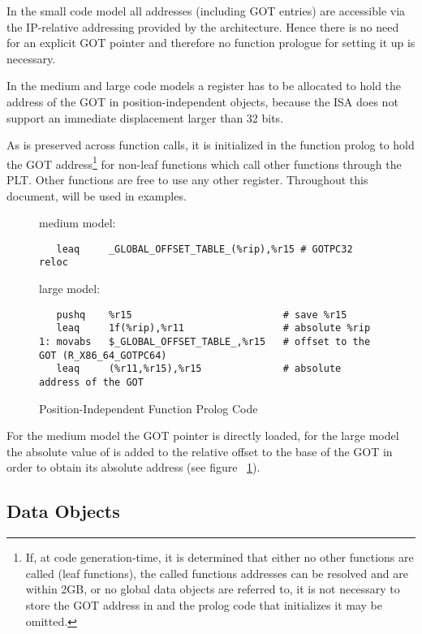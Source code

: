 In the small code model all addresses (including GOT entries) are
accessible via the IP-relative addressing provided by the \xARCH
architecture.  Hence there is no need for an explicit GOT pointer and
therefore no function prologue for setting it up is necessary.

In the medium and large code models a register has to be allocated to hold the
address of the GOT in position-independent objects, because the \xARCH ISA does
not support an immediate displacement larger than 32 bits.

As  is preserved across function calls, it is initialized
in the function prolog to hold the GOT address\footnote{If, at code
generation-time, it is determined that either no other functions are
called (leaf functions), the called functions addresses can be
resolved and are within 2GB, or no global data objects are referred
to, it is not necessary to store the GOT address in  and
the prolog code that initializes it may be omitted.} for non-leaf
functions which call other functions through the PLT. Other functions
are free to use any other register. Throughout this document,
 will be used in examples.

\begin{figure}[H]
\Hrule
\caption{Position-Independent Function Prolog Code} \label{large_pic_prolog}
medium model:
\begin{footnotesize}
\begin{verbatim}
   leaq     _GLOBAL_OFFSET_TABLE_(%rip),%r15 # GOTPC32 reloc
\end{verbatim}
\end{footnotesize}
large model:
\begin{footnotesize}
\begin{verbatim}
   pushq    %r15                          # save %r15
   leaq     1f(%rip),%r11                 # absolute %rip
1: movabs   $_GLOBAL_OFFSET_TABLE_,%r15   # offset to the GOT (R_X86_64_GOTPC64)
   leaq     (%r11,%r15),%r15              # absolute address of the GOT
\end{verbatim}
\end{footnotesize}
\Hrule
\end{figure}%

For the medium model the GOT pointer is directly loaded, for the large
model
the absolute value of  is added to the relative offset to the base
of the GOT in order to obtain its absolute address (see figure~
\ref{large_pic_prolog}).

\subsection{Data Objects}

